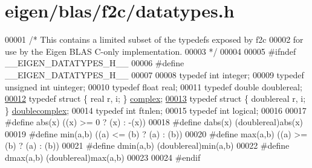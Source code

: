 \hypertarget{eigen_2blas_2f2c_2datatypes_8h_source}{}\section{eigen/blas/f2c/datatypes.h}
\label{eigen_2blas_2f2c_2datatypes_8h_source}

\begin{DoxyCode}
00001 \textcolor{comment}{/* This contains a limited subset of the typedefs exposed by f2c}
00002 \textcolor{comment}{   for use by the Eigen BLAS C-only implementation.}
00003 \textcolor{comment}{*/}
00004 
00005 \textcolor{preprocessor}{#ifndef \_\_EIGEN\_DATATYPES\_H\_\_}
00006 \textcolor{preprocessor}{#define \_\_EIGEN\_DATATYPES\_H\_\_}
00007 
00008 \textcolor{keyword}{typedef} \textcolor{keywordtype}{int} integer;
00009 \textcolor{keyword}{typedef} \textcolor{keywordtype}{unsigned} \textcolor{keywordtype}{int} uinteger;
00010 \textcolor{keyword}{typedef} \textcolor{keywordtype}{float} real;
00011 \textcolor{keyword}{typedef} \textcolor{keywordtype}{double} doublereal;
\hyperlink{structcomplex}{00012} \textcolor{keyword}{typedef} \textcolor{keyword}{struct }\{ real r, i; \} \hyperlink{structcomplex}{complex};
\hyperlink{structdoublecomplex}{00013} \textcolor{keyword}{typedef} \textcolor{keyword}{struct }\{ doublereal r, i; \} \hyperlink{structdoublecomplex}{doublecomplex};
00014 \textcolor{keyword}{typedef} \textcolor{keywordtype}{int} ftnlen;
00015 \textcolor{keyword}{typedef} \textcolor{keywordtype}{int} logical;
00016 
00017 \textcolor{preprocessor}{#define abs(x) ((x) >= 0 ? (x) : -(x))}
00018 \textcolor{preprocessor}{#define dabs(x) (doublereal)abs(x)}
00019 \textcolor{preprocessor}{#define min(a,b) ((a) <= (b) ? (a) : (b))}
00020 \textcolor{preprocessor}{#define max(a,b) ((a) >= (b) ? (a) : (b))}
00021 \textcolor{preprocessor}{#define dmin(a,b) (doublereal)min(a,b)}
00022 \textcolor{preprocessor}{#define dmax(a,b) (doublereal)max(a,b)}
00023 
00024 \textcolor{preprocessor}{#endif}
\end{DoxyCode}
